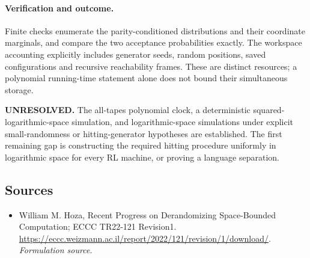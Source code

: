 \documentclass[11pt]{article}
\begin{document}
\paragraph{Verification and outcome.}
Finite checks enumerate the parity-conditioned distributions and their coordinate marginals, and compare the two acceptance probabilities exactly. The workspace accounting explicitly includes generator seeds, random positions, saved configurations and recursive reachability frames. These are distinct resources; a polynomial running-time statement alone does not bound their simultaneous storage.

\textbf{UNRESOLVED.} The all-tapes polynomial clock, a deterministic squared-logarithmic-space simulation, and logarithmic-space simulations under explicit small-randomness or hitting-generator hypotheses are established. The first remaining gap is constructing the required hitting procedure uniformly in logarithmic space for every RL machine, or proving a language separation.

\subsection{Sources}
\begin{itemize}
\item[S1]William M. Hoza, Recent Progress on Derandomizing Space-Bounded Computation; ECCC TR22-121 Revision1.
\url{https://eccc.weizmann.ac.il/report/2022/121/revision/1/download/}.
\textit{Formulation source.}
\end{itemize}
\end{document}
